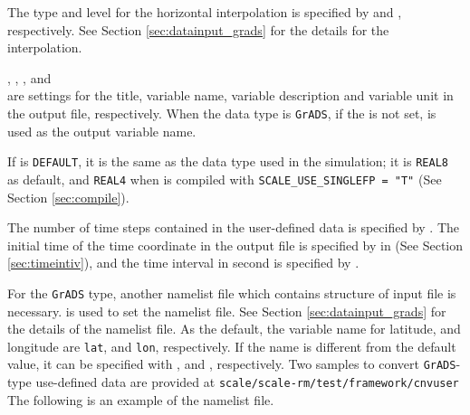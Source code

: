 The type and level for the horizontal interpolation is specified by  and , respectively.
See Section \ref{sec:datainput_grads} for the details for the interpolation.

, , , and \\
 are settings for the title, variable name, variable description and variable unit in the output file, respectively.
When the data type is \verb|GrADS|, if the  is not set,  is used as the output variable name.

If  is \verb|DEFAULT|, it is the same as the data type used in the simulation;
it is \verb|REAL8| as default, and \verb|REAL4| when \scalerm is compiled with \verb|SCALE_USE_SINGLEFP = "T"| (See Section \ref{sec:compile}).

The number of time steps contained in the user-defined data is specified by .
The initial time of the time coordinate in the output file is specified by  in  (See Section \ref{sec:timeintiv}), and the time interval in second is specified by .



For the \verb|GrADS| type, another namelist file which contains structure of input file is necessary.
 is used to set the namelist file.
See Section \ref{sec:datainput_grads} for the details of the namelist file.
As the default, the variable name for latitude, and longitude are \verb|lat|, and \verb|lon|, respectively.
If the name is different from the default value, it can be specified with , and , respectively.
Two samples to convert \verb|GrADS|-type use-defined data are provided at \verb|scale/scale-rm/test/framework/cnvuser|
The following is an example of the namelist file.



